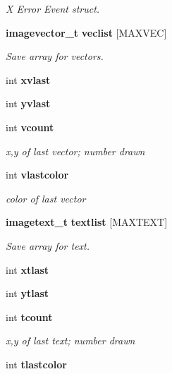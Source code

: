 \begin{CompactItemize}
\begin{CompactList}\small\item\em X Error Event struct. \item\end{CompactList}\item 
{\bf imagevector\_\-t} {\bf veclist} [MAXVEC]\label{xtvutils_8c_a52}

\begin{CompactList}\small\item\em Save array for vectors. \item\end{CompactList}\item 
int {\bf xvlast}\label{xtvutils_8c_a53}

\item 
int {\bf yvlast}\label{xtvutils_8c_a54}

\item 
int {\bf vcount}\label{xtvutils_8c_a55}

\begin{CompactList}\small\item\em x,y of last vector; number drawn \item\end{CompactList}\item 
int {\bf vlastcolor}\label{xtvutils_8c_a56}

\begin{CompactList}\small\item\em color of last vector \item\end{CompactList}\item 
{\bf imagetext\_\-t} {\bf textlist} [MAXTEXT]\label{xtvutils_8c_a57}

\begin{CompactList}\small\item\em Save array for text. \item\end{CompactList}\item 
int {\bf xtlast}\label{xtvutils_8c_a58}

\item 
int {\bf ytlast}\label{xtvutils_8c_a59}

\item 
int {\bf tcount}\label{xtvutils_8c_a60}

\begin{CompactList}\small\item\em x,y of last text; number drawn \item\end{CompactList}\item 
int {\bf tlastcolor}\label{xtvutils_8c_a61}


\end{CompactItemize}
